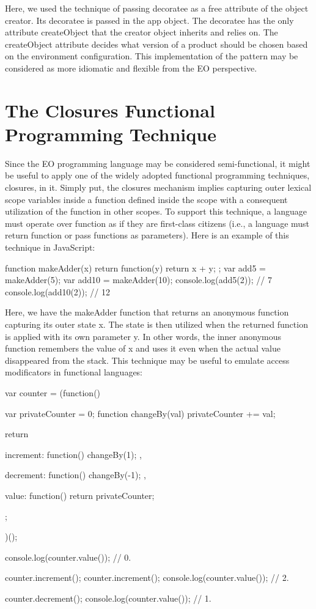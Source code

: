 \documentclass[12pt]{book}
\begin{document}
Here, we used the technique of passing decoratee as a free attribute of the object creator. Its decoratee is passed in the app object. The decoratee has the only attribute createObject that the creator object inherits and relies on. The createObject attribute decides what version of a product should be chosen based on the environment configuration. This implementation of the pattern may be considered as more idiomatic and flexible from the EO perspective.


\section{The Closures Functional Programming Technique}
Since the EO programming language may be considered semi-functional, it might be useful to apply one of the widely adopted functional programming techniques, closures, in it. Simply put, the closures mechanism implies capturing outer lexical scope variables inside a function defined inside the scope with a consequent utilization of the function in other scopes. To support this technique, a language must operate over function as if they are first-class citizens (i.e., a language must return function or pass functions as parameters). Here is an example of this technique in JavaScript:

\begin{ffcode}
function makeAdder(x) {
  return function(y) {
    return x + y;
  };
}
var add5 = makeAdder(5);
var add10 = makeAdder(10);
console.log(add5(2));  // 7
console.log(add10(2)); // 12
\end{ffcode}

Here, we have the makeAdder function that returns an anonymous function capturing its outer state x. The state is then utilized when the returned function is applied with its own parameter y. In other words, the inner anonymous function remembers the value of x and uses it even when the actual value disappeared from the stack. This technique may be useful to emulate access modificators in functional languages: 

\begin{ffcode}
var counter = (function() {
  var privateCounter = 0;
  function changeBy(val) {
    privateCounter += val;
  }

  return {
    increment: function() {
      changeBy(1);
    },

    decrement: function() {
      changeBy(-1);
    },

    value: function() {
      return privateCounter;
    }
  };
})();

console.log(counter.value());  // 0.

counter.increment();
counter.increment();
console.log(counter.value());  // 2.

counter.decrement();
console.log(counter.value());  // 1.
\end{ffcode}
\end{document}
